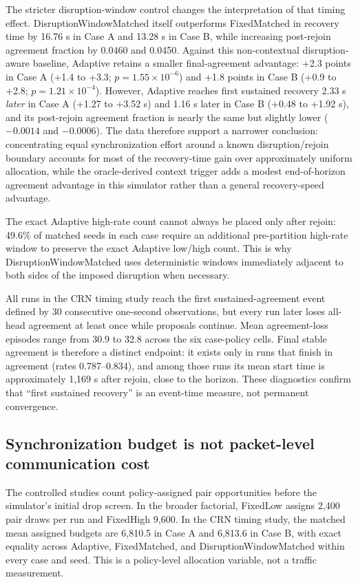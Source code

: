 \documentclass[11pt]{article}
\begin{document}
The stricter disruption-window control changes the interpretation of that timing effect. DisruptionWindowMatched itself outperforms FixedMatched in recovery time by 16.76 s in Case A and 13.28 s in Case B, while increasing post-rejoin agreement fraction by 0.0460 and 0.0450. Against this non-contextual disruption-aware baseline, Adaptive retains a smaller final-agreement advantage: +2.3 points in Case A (+1.4 to +3.3; $p=1.55\times10^{-6}$) and +1.8 points in Case B (+0.9 to +2.8; $p=1.21\times10^{-4}$). However, Adaptive reaches first sustained recovery 2.33 s \emph{later} in Case A (+1.27 to +3.52 s) and 1.16 s later in Case B (+0.48 to +1.92 s), and its post-rejoin agreement fraction is nearly the same but slightly lower ($-0.0014$ and $-0.0006$). The data therefore support a narrower conclusion: concentrating equal synchronization effort around a known disruption/rejoin boundary accounts for most of the recovery-time gain over approximately uniform allocation, while the oracle-derived context trigger adds a modest end-of-horizon agreement advantage in this simulator rather than a general recovery-speed advantage.

The exact Adaptive high-rate count cannot always be placed only after rejoin: 49.6\% of matched seeds in each case require an additional pre-partition high-rate window to preserve the exact Adaptive low/high count. This is why DisruptionWindowMatched uses deterministic windows immediately adjacent to both sides of the imposed disruption when necessary.

All runs in the CRN timing study reach the first sustained-agreement event defined by 30 consecutive one-second observations, but every run later loses all-head agreement at least once while proposals continue. Mean agreement-loss episodes range from 30.9 to 32.8 across the six case-policy cells. Final stable agreement is therefore a distinct endpoint: it exists only in runs that finish in agreement (rates 0.787--0.834), and among those runs its mean start time is approximately 1,169 s after rejoin, close to the horizon. These diagnostics confirm that ``first sustained recovery'' is an event-time measure, not permanent convergence.

\subsection{Synchronization budget is not packet-level communication cost}
The controlled studies count policy-assigned pair opportunities before the simulator's initial drop screen. In the broader factorial, FixedLow assigns 2,400 pair draws per run and FixedHigh 9,600. In the CRN timing study, the matched mean assigned budgets are 6,810.5 in Case A and 6,813.6 in Case B, with exact equality across Adaptive, FixedMatched, and DisruptionWindowMatched within every case and seed. This is a policy-level allocation variable, not a traffic measurement.
\end{document}
